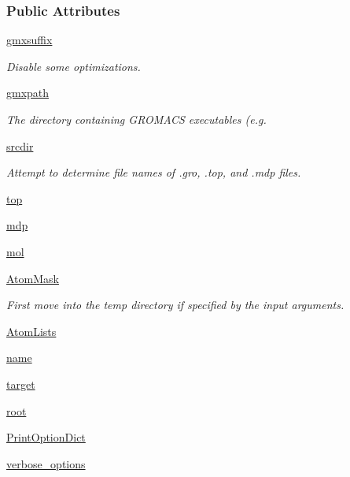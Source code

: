 \subsubsection*{Public Attributes}
\begin{DoxyCompactItemize}
\item 
\hyperlink{classforcebalance_1_1gmxio_1_1GMX_ad3255c98ff1cdd0f3ae115857d899ce5}{gmxsuffix}
\begin{DoxyCompactList}\small\item\em Disable some optimizations. \end{DoxyCompactList}\item 
\hyperlink{classforcebalance_1_1gmxio_1_1GMX_ab2081cd93ac2c3a80e205884e0f12710}{gmxpath}
\begin{DoxyCompactList}\small\item\em The directory containing G\-R\-O\-M\-A\-C\-S executables (e.\-g. \end{DoxyCompactList}\item 
\hyperlink{classforcebalance_1_1gmxio_1_1GMX_aa659f4e669182ddb70d6146150bfb63b}{srcdir}
\begin{DoxyCompactList}\small\item\em Attempt to determine file names of .gro, .top, and .mdp files. \end{DoxyCompactList}\item 
\hyperlink{classforcebalance_1_1gmxio_1_1GMX_acdd7f2bbbdbb41c9abcfafb1c22751fe}{top}
\item 
\hyperlink{classforcebalance_1_1gmxio_1_1GMX_a6476e88d7e7aefec1fe2d07e30be2eb2}{mdp}
\item 
\hyperlink{classforcebalance_1_1gmxio_1_1GMX_a7accb28dad3f9986cc8b622125feed5d}{mol}
\item 
\hyperlink{classforcebalance_1_1gmxio_1_1GMX_a9503a409fe32d337e8b6f89806185ba3}{Atom\-Mask}
\begin{DoxyCompactList}\small\item\em First move into the temp directory if specified by the input arguments. \end{DoxyCompactList}\item 
\hyperlink{classforcebalance_1_1gmxio_1_1GMX_a1959c66297d10f4333e5dd85f3eba012}{Atom\-Lists}
\item 
\hyperlink{classforcebalance_1_1engine_1_1Engine_add3a4bf15527832034d88fb692a37115}{name}
\item 
\hyperlink{classforcebalance_1_1engine_1_1Engine_a1fdd29fbd127cba331326a3557558e2a}{target}
\item 
\hyperlink{classforcebalance_1_1engine_1_1Engine_a82e9382a3316d3e26ef29efb58db4a00}{root}
\item 
\hyperlink{classforcebalance_1_1BaseClass_afc6659278497d7245bc492ecf405ccae}{Print\-Option\-Dict}
\item 
\hyperlink{classforcebalance_1_1BaseClass_afd68efa29ccd2f320f4cf82198214aac}{verbose\-\_\-options}
\end{DoxyCompactItemize}


